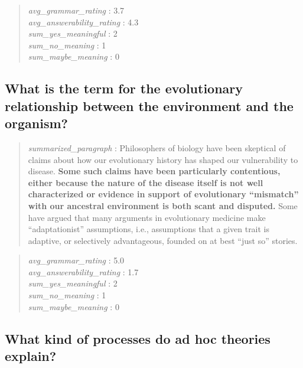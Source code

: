 \begin{quote}
\emph{avg\_grammar\_rating} : 3.7\\
\emph{avg\_answerability\_rating} : 4.3\\
\emph{sum\_yes\_meaningful} : 2\\
\emph{sum\_no\_meaning} : 1\\
\emph{sum\_maybe\_meaning} : 0
\end{quote}

\hypertarget{what-is-the-term-for-the-evolutionary-relationship-between-the-environment-and-the-organism}{%
\subsection{What is the term for the evolutionary relationship between
the environment and the
organism?}\label{what-is-the-term-for-the-evolutionary-relationship-between-the-environment-and-the-organism}}

\begin{quote}
\emph{summarized\_paragraph} : Philosophers of biology have been
skeptical of claims about how our evolutionary history has shaped our
vulnerability to disease. \textbf{Some such claims have been
particularly contentious, either because the nature of the disease
itself is not well characterized or evidence in support of evolutionary
``mismatch'' with our ancestral environment is both scant and disputed.}
Some have argued that many arguments in evolutionary medicine make
``adaptationist'' assumptions, i.e., assumptions that a given trait is
adaptive, or selectively advantageous, founded on at best ``just so''
stories.
\end{quote}

\begin{quote}
\emph{avg\_grammar\_rating} : 5.0\\
\emph{avg\_answerability\_rating} : 1.7\\
\emph{sum\_yes\_meaningful} : 2\\
\emph{sum\_no\_meaning} : 1\\
\emph{sum\_maybe\_meaning} : 0
\end{quote}

\hypertarget{what-kind-of-processes-do-ad-hoc-theories-explain}{%
\subsection{What kind of processes do ad hoc theories
explain?}\label{what-kind-of-processes-do-ad-hoc-theories-explain}}

